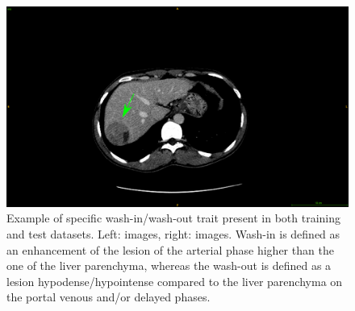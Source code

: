 \begin{figure}[!ht]
\begin{minipage}{0.45\linewidth}
	\end{minipage} \hspace{-0.1cm}
	\begin{minipage}{0.45\linewidth}
		\includegraphics[width=\linewidth]{../Contributions/images/ImagingTraits/ResizeTCIA_washout}
	\end{minipage}
	\caption{Example of specific wash-in/wash-out trait present in both training and test datasets. Left: \textbf{} images, right: \textbf{} images.
	Wash-in is defined as an enhancement of the lesion of the arterial phase higher than the one of the liver parenchyma, whereas the wash-out is defined as a lesion hypodense/hypointense compared to the liver parenchyma on the portal venous and/or delayed phases.}
	\label{fig:InterDb_imagingTraits3}
\end{figure}


